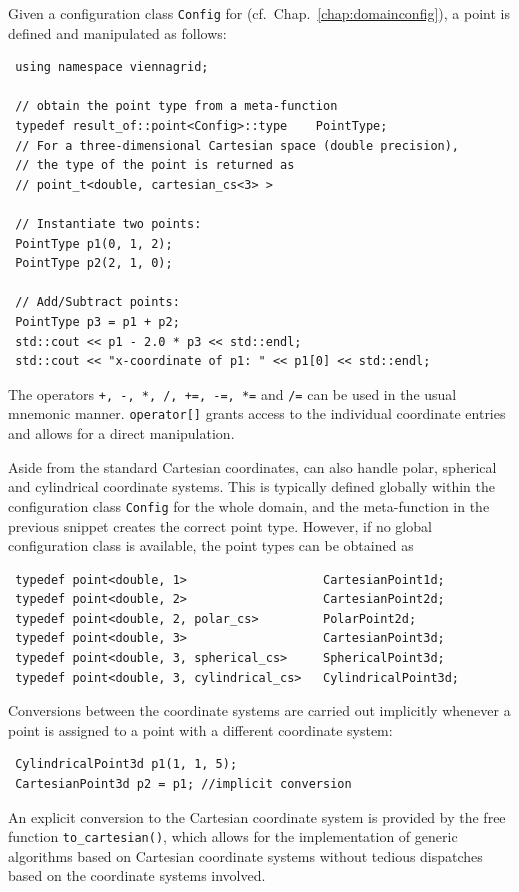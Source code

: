 Given a configuration class \lstinline|Config| for {\ViennaGrid} (cf.~Chap.~\ref{chap:domainconfig}), a point is defined and manipulated as follows:
\begin{lstlisting}
 using namespace viennagrid;

 // obtain the point type from a meta-function
 typedef result_of::point<Config>::type    PointType;
 // For a three-dimensional Cartesian space (double precision),
 // the type of the point is returned as
 // point_t<double, cartesian_cs<3> >

 // Instantiate two points:
 PointType p1(0, 1, 2);
 PointType p2(2, 1, 0);

 // Add/Subtract points:
 PointType p3 = p1 + p2;
 std::cout << p1 - 2.0 * p3 << std::endl;
 std::cout << "x-coordinate of p1: " << p1[0] << std::endl;
\end{lstlisting}
The operators \lstinline|+, -, *, /, +=, -=, *=| and \lstinline|/=| can be used in the usual mnemonic manner. \lstinline|operator[]| grants access to the individual coordinate entries and allows for a direct manipulation.

Aside from the standard Cartesian coordinates, {\ViennaGrid} can also handle polar, spherical and cylindrical coordinate systems.
This is typically defined globally within the configuration class \lstinline|Config| for the whole domain, and the meta-function in the previous snippet creates the correct point type. However, if no global configuration class is available, the point types can be obtained as
\begin{lstlisting}
 typedef point<double, 1>                   CartesianPoint1d;
 typedef point<double, 2>                   CartesianPoint2d;
 typedef point<double, 2, polar_cs>         PolarPoint2d;
 typedef point<double, 3>                   CartesianPoint3d;
 typedef point<double, 3, spherical_cs>     SphericalPoint3d;
 typedef point<double, 3, cylindrical_cs>   CylindricalPoint3d;
\end{lstlisting}
Conversions between the coordinate systems are carried out implicitly whenever a point is assigned to a point with a different coordinate system:
\begin{lstlisting}
 CylindricalPoint3d p1(1, 1, 5);
 CartesianPoint3d p2 = p1; //implicit conversion
\end{lstlisting}
An explicit conversion to the Cartesian coordinate system is provided by the free function \lstinline|to_cartesian()|, which allows for the implementation of generic algorithms based on Cartesian coordinate systems without tedious dispatches based on the coordinate systems involved.


